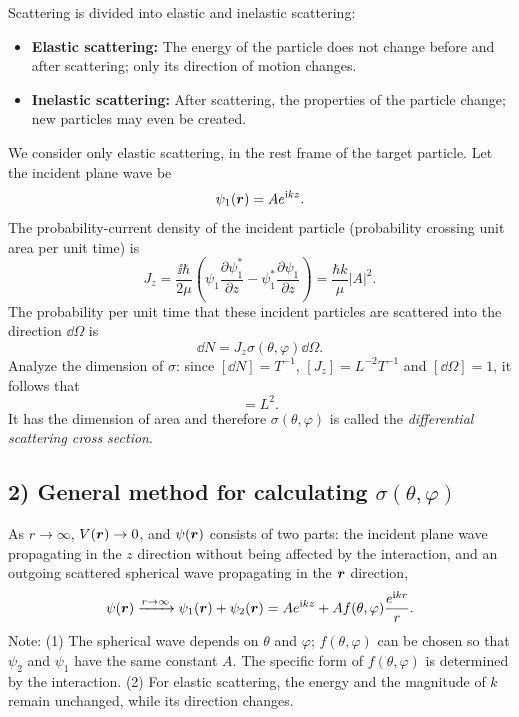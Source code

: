 Scattering is divided into elastic and inelastic scattering:
\begin{itemize}
\item \textbf{Elastic scattering:} The energy of the particle does not change before and after scattering; only its direction of motion changes.
\item \textbf{Inelastic scattering:} After scattering, the properties of the particle change; new particles may even be created.
\end{itemize}
We consider only elastic scattering, in the rest frame of the target particle. Let the incident plane wave be
\begin{equation}
\psi_1(\bm{r})=A e^{\mathrm{i} kz}.
\end{equation}
The probability-current density of the incident particle (probability crossing unit area per unit time) is
\begin{equation}
J_z=\frac{\ii\hbar}{2\mu}\left(\psi_1\frac{\partial\psi_1^*}{\partial z}-\psi_1^*\frac{\partial\psi_1}{\partial z}\right)
=\frac{\hbar k}{\mu}|A|^2.
\end{equation}
The probability per unit time that these incident particles are scattered into the direction $\dd\Omega$ is
\begin{equation}
\dd N=J_z\sigma(\theta,\varphi)\dd\Omega.
\end{equation}
Analyze the dimension of $\sigma$: since $[\dd N]=T^{-1}$, $[J_z]=L^{-2}T^{-1}$ and $[\dd\Omega]=1$, it follows that
\begin{equation}
[\sigma]=L^2.
\end{equation}
It has the dimension of area and therefore $\sigma(\theta,\varphi)$ is called the \emph{differential scattering cross section}.

\subsection*{2) General method for calculating $\sigma(\theta,\varphi)$}
As $r\to\infty$, $V(\bm{r})\to0$, and $\psi(\bm{r})$ consists of two parts: the incident plane wave propagating in the $z$ direction without being affected by the interaction, and an outgoing scattered spherical wave propagating in the $\bm{r}$ direction,
\begin{equation}
\psi(\bm{r})\xrightarrow{r\to\infty}\psi_1(\bm{r})+\psi_2(\bm{r})
=Ae^{\mathrm{i} kz}+Af(\theta,\varphi)\frac{e^{\mathrm{i} kr}}r.
\end{equation}
Note: (1) The spherical wave depends on $\theta$ and $\varphi$; $f(\theta,\varphi)$ can be chosen so that $\psi_2$ and $\psi_1$ have the same constant $A$. The specific form of $f(\theta,\varphi)$ is determined by the interaction. (2) For elastic scattering, the energy and the magnitude of $k$ remain unchanged, while its direction changes.

